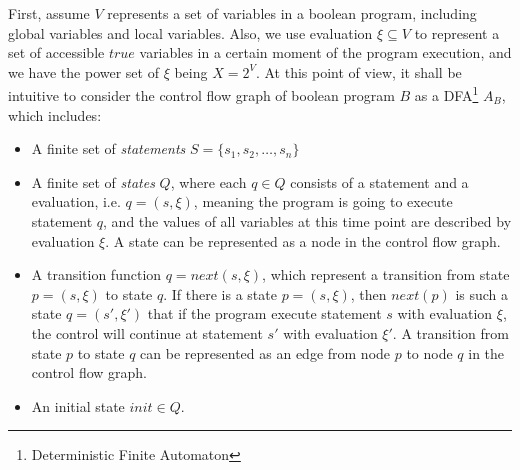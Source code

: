 First, assume $V$ represents a set of variables in a boolean program, including global variables and local variables.
Also, we use evaluation $\xi\subseteq V$ to represent a set of accessible $true$ variables in a certain moment of the program execution, and we have the power set of $\xi$ being $X = 2^{V}$.
At this point of view, it shall be intuitive to consider the control flow graph of boolean program $B$ as a DFA\footnote{Deterministic Finite Automaton} $A_{B}$, which includes:
\begin{itemize}
\item A finite set of {\it statements} $S=\{s_{1},s_{2},\dots,s_{n}\}$
\item A finite set of {\it states} $Q$, where each $q \in Q$ consists of a statement and a evaluation, i.e. $q=(s,\xi)$, meaning the program is going to execute statement $q$, and the values of all variables at this time point are described by evaluation $\xi$. A state can be represented as a node in the control flow graph.
\item A transition function $q=next(s,\xi)$, which represent a transition from state $p=(s,\xi)$ to state $q$. If there is a state $p=(s,\xi)$, then $next(p)$ is such a state $q=(s\prime,\xi\prime)$ that if the program execute statement $s$ with evaluation $\xi$, the control will continue at statement $s\prime$ with evaluation $\xi\prime$. A transition from state $p$ to state $q$ can be represented as an edge from node $p$ to node $q$ in the control flow graph.
\item An initial state $init \in Q$.
\end{itemize}

